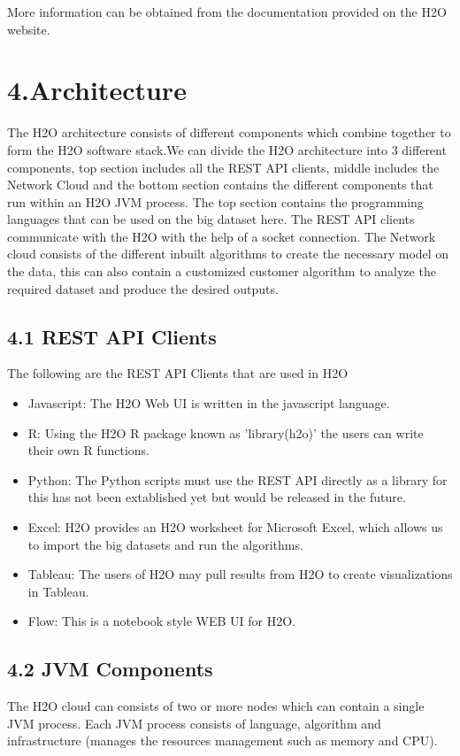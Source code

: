 \documentclass[9pt,twocolumn,twoside]{../../styles/osajnl}
\begin{document}
More information can be obtained from the documentation provided on
the H2O website\cite{www-h2o-requirements}.

\section{4.Architecture}

The H2O architecture consists of different components which combine
together to form the H2O software stack.\newline We can divide the H2O
architecture into 3 different components, top section includes all the
REST API clients, middle includes the Network Cloud and the bottom
section contains the different components that run within an H2O JVM
process\cite{www-h2o-architecture}. The top section contains the
programming languages that can be used on the big dataset here. The
REST API clients communicate with the H2O with the help of a socket
connection\cite{www-h2o-architecture}. The Network cloud consists of
the different inbuilt algorithms to create the necessary model on the
data, this can also contain a customized customer algorithm to analyze
the required dataset and produce the desired outputs.

\subsection{4.1 REST API Clients}
The following are the REST API Clients that are used in H2O

\begin{itemize}
  \item Javascript: The H2O Web UI is written in the javascript language.
\item R: Using the H2O R package known as 'library(h2o)' the users can write their own R functions.
\item Python: The Python scripts must use the REST API directly as a library for this has not been extablished yet but would be released in the future.
\item Excel: H2O provides an H2O worksheet for Microsoft Excel, which allows us to import the big datasets and run the algorithms.
\item Tableau: The users of H2O may pull results from H2O to create visualizations in Tableau.
\item Flow: This is a notebook style WEB UI for H2O\cite{www-h2o-architecture}.
\end{itemize}
\subsection{4.2 JVM Components}
The H2O cloud can consists of two or more nodes
which can contain a single JVM process. Each JVM process consists of
language, algorithm and infrastructure (manages the resources
management such as memory and CPU)\cite{www-h2o-architecture}.
\end{document}
